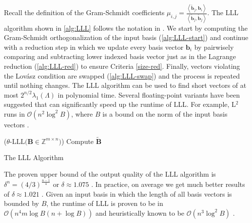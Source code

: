 Recall the definition of the Gram-Schmidt coefficients $\mu_{i, j} = \frac{\left\langle \tilde{\mathbf{b}}_j, \mathbf{b}_i\right\rangle}{\left\langle \tilde{\mathbf{b}}_j, \tilde{\mathbf{b}}_j\right\rangle}$. The LLL algorithm shown in \cref{alg:LLL} follows the notation in \cite{LLLReg04}. We start by computing the Gram-Schmidt orthogonalization of the input basis (\cref{alg:LLL-start}) and continue with a reduction step in which we update every basis vector $\mathbf{b}_i$ by pairwisely comparing and subtracting lower indexed basis vector just as in the Lagrange reduction (\cref{alg:LLL-red}) to ensure Criteria \ref{size-red}. Finally, vectors violating the Lovász condition are swapped (\cref{alg:LLL-swap}) and the process is repeated until nothing changes. The LLL algorithm can be used to find short vectors of at most $2^{n/2} \lambda_1(\Lambda)$ in polynomial time. Several floating-point variants have been suggested that can significantly speed up the runtime of LLL. For example, L$^2$ runs in $\mathcal{O}(n^2 \log^2 B)$, where $B$ is a bound on the norm of the input basis vectors \cite{NS05}. %

\begin{algorithm2e}
  \Begin($\theta\text{-LLL} {(}\mathbf{B} \in \mathbb{Z}^{m\times n} {)}$) %
  {
    Compute $\tilde{\mathbf{B}}$\label{alg:LLL-start}\\
  }
  \caption[The LLL Algorithm]{The LLL Algorithm \cite{LLL82}} \label{alg:LLL}
\end{algorithm2e}


The proven upper bound of the output quality of the LLL algorithm is $\delta^n = \left(4/3\right)^{\frac{n-1}{4}}$ or $\delta \approx 1.075$ \cite{LLL82}. In practice, on average we get much better results of $\delta \approx 1.021$ \cite{Chen13}. Given an input basis in which the length of all basis vectors is bounded by $B$, the runtime of LLL is proven to be in $\mathcal{O}\left(n^4m\log B(n+\log B)\right)$ \cite{NS05} and heuristically known to be $\mathcal{O}\left(n^{3}\log^2 B\right)$ \cite{APS15}.



